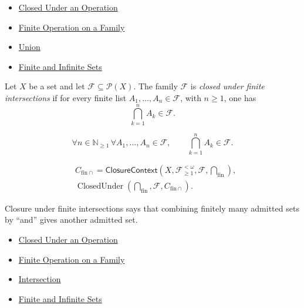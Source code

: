 \begin{dependencies}
\begin{itemize}
  \item \hyperref[def:closed-under-operation]{Closed Under an Operation}
  \item \hyperref[def:finite-operation-on-family]{Finite Operation on a Family}
  \item \hyperref[def:union]{Union}
  \item \hyperref[def:finite-infinite]{Finite and Infinite Sets}
\end{itemize}
\end{dependencies}

\begin{definition}\label{def:closed-under-finite-intersections}
Let \(X\) be a set and let \(\mathcal{F}\subseteq\mathcal{P}(X)\).  The family
\(\mathcal{F}\) is \emph{closed under finite intersections} if for every
finite list \(A_1,\dots,A_n\in\mathcal{F}\), with \(n\geq 1\), one has
\[
  \bigcap_{k=1}^{n} A_k \in \mathcal{F}.
\]
\end{definition}

\begin{remark*}
\[
  \forall n\in\mathbb{N}_{\geq 1}\,
  \forall A_1,\dots,A_n\in\mathcal{F},\qquad
  \bigcap_{k=1}^{n}A_k\in\mathcal{F}.
\]
\end{remark*}

\begin{remark*}
\[
\begin{aligned}
&C_{\mathrm{fin}\cap}
=\mathsf{ClosureContext}(X,\mathcal{F}^{<\omega}_{\geq 1},\mathcal{F},\bigcap_{\mathrm{fin}}),\\
&\operatorname{ClosedUnder}(\bigcap_{\mathrm{fin}},\mathcal{F},C_{\mathrm{fin}\cap}).
\end{aligned}
\]
\end{remark*}

\begin{remark*}[Interpretation]
Closure under finite intersections says that combining finitely many admitted
sets by ``and'' gives another admitted set.
\end{remark*}

\begin{dependencies}
\begin{itemize}
  \item \hyperref[def:closed-under-operation]{Closed Under an Operation}
  \item \hyperref[def:finite-operation-on-family]{Finite Operation on a Family}
  \item \hyperref[def:intersection]{Intersection}
  \item \hyperref[def:finite-infinite]{Finite and Infinite Sets}
\end{itemize}
\end{dependencies}
